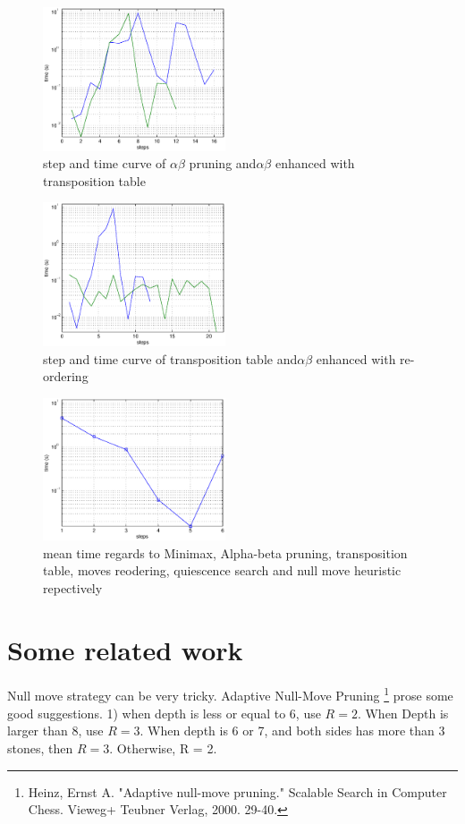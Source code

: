 \documentclass{article}
\begin{document}
\begin{figure}[!h]
\centering
\includegraphics[width=0.48\textwidth]{mini_trans.eps}
\caption{step and time curve of $\alpha\beta$ pruning and$\alpha\beta$ enhanced with transposition table }
\label{abtrans}
\end{figure}

\begin{figure}[!h]
\centering
\includegraphics[width=0.48\textwidth]{trans_order.eps}
\caption{step and time curve of transposition table and$\alpha\beta$ enhanced with re-ordering}
\label{transorder}
\end{figure}

\begin{figure}[!h]
\centering
\includegraphics[width=0.48\textwidth]{meantime.eps}
\caption{mean time regards to Minimax, Alpha-beta pruning, transposition table, moves reodering, quiescence search and null move heuristic  repectively}
\label{meantime}
\end{figure}


\clearpage
\section{Some related work}

Null move strategy can be very tricky. Adaptive Null-Move Pruning \footnote{Heinz, Ernst A. "Adaptive null-move pruning." Scalable Search in Computer Chess. Vieweg+ Teubner Verlag, 2000. 29-40.} prose some good suggestions. 1) when depth is less or equal to 6, use $R=2$. When Depth is larger than 8, use $R=3$. When depth is 6 or 7, and both sides has more than 3 stones, then $R = 3$. Otherwise, R = 2.
\end{document}
